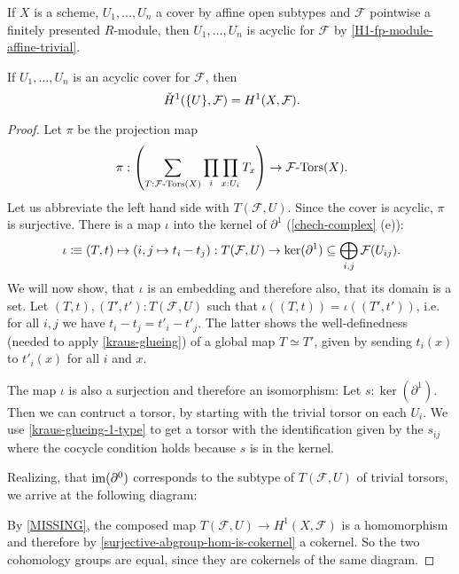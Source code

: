 \begin{example}
  If $X$ is a scheme, $U_1,\dots,U_n$ a cover by affine open subtypes and $\mathcal F$ pointwise a finitely presented $R$-module,
  then $U_1,\dots,U_n$ is acyclic for $\mathcal F$ by \cref{H1-fp-module-affine-trivial}.
\end{example}

\begin{theorem}%
  If $U_1,\dots,U_n$ is an acyclic cover for $\mathcal F$, then
  \[
    \check{H}^1(\{U\},\mathcal F)=H^1(X,\mathcal F)\rlap{.}
  \]
\end{theorem}

\begin{proof}
  Let $\pi$ be the projection map
  \[
    \pi :
    \left(
      \sum_{T:\Tors{\mathcal F}(X)}\prod_{i}\prod_{x:U_i}T_x
    \right)
    \to \Tors{\mathcal F}(X)\rlap{.}
  \]
  Let us abbreviate the left hand side with $T(\mathcal F,U)$.
  Since the cover is acyclic, $\pi$ is surjective.
  There is a map $\iota$ into the kernel of $\partial^1$ (\cref{chech-complex} (e)):
  \[
    \iota \colonequiv
    (T,t) \mapsto (i,j\mapsto t_i - t_j) :
    T(\mathcal F,U)
    \to
    \ker(\partial^1)
    \subseteq
    \bigoplus_{i,j}\mathcal F(U_{ij})\rlap{.}
  \]
  We will now show, that $\iota$ is an embedding and therefore also, that its domain is a set.
  Let $(T,t),(T',t'):T(\mathcal F,U)$ such that $\iota((T,t))=\iota((T',t'))$,
  i.e. for all $i,j$ we have $t_i-t_j=t'_i-t'_j$.
  The latter shows the well-definedness (needed to apply \cref{kraus-glueing})
  of a global map $T\simeq T'$, given by sending $t_i(x)$ to $t'_i(x)$
  for all $i$ and $x$.

  The map $\iota$ is also a surjection and therefore an isomorphism:
  Let $s:\ker(\partial^1)$.
  Then we can contruct a torsor,
  by starting with the trivial torsor on each $U_i$.
  We use \cref{kraus-glueing-1-type} to get a torsor
  with the identification given by the $s_{ij}$
  where the cocycle condition holds because $s$ is in the kernel.

  Realizing, that $\operatorname{im}(\partial^0)$ corresponds to the subtype of $T(\mathcal F,U)$ of trivial torsors,
  we arrive at the following diagram:
  \begin{center}
  \end{center}
  By \cref{MISSING},
  the composed map $T(\mathcal F,U)\to H^1(X,\mathcal F)$ is a homomorphism
  and therefore by \cref{surjective-abgroup-hom-is-cokernel} a cokernel.
  So the two cohomology groups are equal, since they are cokernels of the same diagram.
\end{proof}
